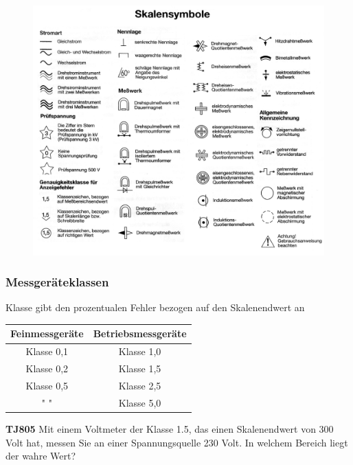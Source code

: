 \begin{frame}
  \begin{center}
    \begin{figure}
      \includegraphics[width=\textwidth,height=.9\textheight,keepaspectratio]{a16/Symbole.png}
    \end{figure}
  \end{center}
\end{frame}

\begin{frame}
  \frametitle{Messgeräteklassen}
  Klasse gibt den prozentualen Fehler bezogen auf den Skalenendwert an
  \begin{center}
    \begin{tabular}{c|c}
      \textbf{Feinmessgeräte} & \textbf{Betriebsmessgeräte}\\ \hline
      Klasse 0,1 & Klasse 1,0 \\
      Klasse 0,2 & Klasse 1,5 \\
      Klasse 0,5 & Klasse 2,5 \\
      " " & Klasse 5,0 \\
    \end{tabular}
  \end{center}

  \pause

  \begin{exampleblock}{\textbf{TJ805} Mit einem Voltmeter der Klasse 1.5, das einen Skalenendwert von 300 Volt hat, messen Sie an einer Spannungsquelle 230 Volt. In welchem Bereich liegt der wahre Wert?}
  \end{exampleblock}
\end{frame}

